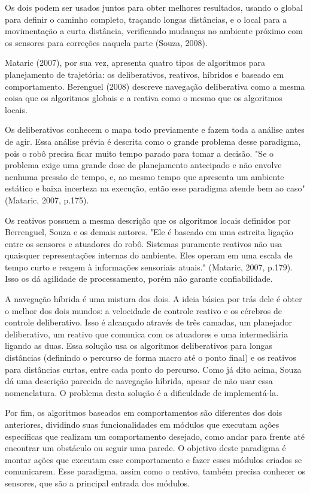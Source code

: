 Os dois podem ser usados juntos para obter melhores resultados, usando o global para definir o caminho completo, traçando longas distâncias, e o local para a movimentação a curta distância, verificando mudanças no ambiente próximo com os sensores para correções naquela parte (Souza, 2008).

Mataric (2007), por sua vez, apresenta quatro tipos de algoritmos para planejamento de trajetória: os deliberativos, reativos, híbridos e baseado em comportamento. Berenguel (2008) descreve navegação deliberativa como a mesma coisa que os algoritmos globais e a reativa como o mesmo que os algoritmos locais.

Os deliberativos conhecem o mapa todo previamente e fazem toda a análise antes de agir. Essa análise prévia é descrita como o grande problema desse paradigma, pois o robô precisa ficar muito tempo parado para tomar a decisão. "Se o problema exige uma grande dose de planejamento antecipado e não envolve nenhuma pressão de tempo, e, ao mesmo tempo que apresenta um ambiente estático e baixa incerteza na execução, então esse paradigma atende bem ao caso" (Mataric, 2007, p.175). 

Os reativos possuem a mesma descrição que os algoritmos locais definidos por Berrenguel, Souza e os demais autores. "Ele é baseado em uma estreita ligação entre os sensores e atuadores do robô. Sistemas puramente reativos não usa quaisquer representações internas do ambiente. Eles operam em uma escala de tempo curto e reagem à informações sensoriais atuais." (Mataric, 2007, p.179). Isso os dá agilidade de processamento, porém não garante confiabilidade.

A navegação híbrida é uma mistura dos dois. A ideia básica por trás dele é obter o melhor dos dois mundos: a velocidade de controle reativo e os cérebros de controle deliberativo. Isso é alcançado através de três camadas, um planejador deliberativo, um reativo que comunica com os atuadores e uma intermediária ligando as duas. Essa solução usa os algoritmos deliberativos para longas distâncias (definindo o percurso de forma macro até o ponto final) e os reativos para distâncias curtas, entre cada ponto do percurso. Como já dito acima, Souza dá uma descrição parecida de navegação híbrida, apesar de não usar essa nomenclatura. O problema desta solução é a dificuldade de implementá-la.

Por fim, os algoritmos baseados em comportamentos são diferentes dos dois anteriores, dividindo suas funcionalidades em módulos que executam ações específicas que realizam um comportamento desejado, como andar para frente até encontrar um obstáculo ou seguir uma parede. O objetivo deste paradigma é montar ações que executam esse comportamento e fazer esses módulos criados se comunicarem. Esse paradigma, assim como o reativo, também precisa conhecer os sensores, que são a principal entrada dos módulos.


